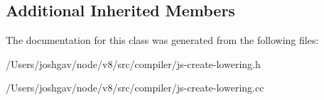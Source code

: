 \subsection*{Additional Inherited Members}


The documentation for this class was generated from the following files\+:\begin{DoxyCompactItemize}
\item 
/\+Users/joshgav/node/v8/src/compiler/js-\/create-\/lowering.\+h\item 
/\+Users/joshgav/node/v8/src/compiler/js-\/create-\/lowering.\+cc\end{DoxyCompactItemize}
